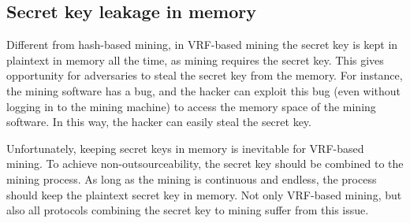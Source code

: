 


\subsection{Secret key leakage in memory}

Different from hash-based mining, in VRF-based mining the secret key is kept in plaintext in memory all the time, as mining requires the secret key. This gives opportunity for adversaries to steal the secret key from the memory. For instance, the mining software has a bug, and the hacker can exploit this bug (even without logging in to the mining machine) to access the memory space of the mining software. In this way, the hacker can easily steal the secret key.

Unfortunately, keeping secret keys in memory is inevitable for VRF-based mining. To achieve non-outsourceability, the secret key should be combined to the mining process. As long as the mining is continuous and endless, the process should keep the plaintext secret key in memory. Not only VRF-based mining, but also all protocols combining the secret key to mining suffer from this issue.

